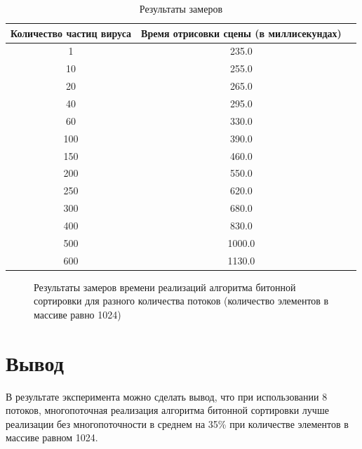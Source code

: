 \begin{table}[h]
	\begin{center}
		\begin{threeparttable}
			\captionsetup{justification=raggedright,singlelinecheck=off}
			\caption{\label{tbl:timings} Результаты замеров}
			\begin{tabular}{|c|c|c|}
				\hline
				Количество частиц вируса& Время отрисовки сцены (в миллисекундах) \\  \hline
				1 & 235.0 \\ \hline 
				10 & 255.0 \\ \hline 
				20 & 265.0 \\ \hline 
				40 & 295.0 \\ \hline 
				60 & 330.0 \\ \hline 
				100 & 390.0 \\ \hline 
				150 & 460.0 \\ \hline 
				200 & 550.0 \\ \hline 
				250 & 620.0 \\ \hline 
				300 & 680.0 \\ \hline 
				400 & 830.0 \\ \hline 
				500 & 1000.0 \\ \hline 
				600 & 1130.0 \\ \hline 
			\end{tabular}
		\end{threeparttable}
	\end{center}
	
\end{table}

\begin{figure}[ph!]
	\caption{Результаты замеров времени реализаций алгоритма битонной сортировки для разного количества потоков (количество элементов в массиве равно 1024)}
	\label{fig:timings}
\end{figure}

\clearpage

\section*{Вывод}

В результате эксперимента можно сделать вывод, что при использовании 8 потоков, многопоточная реализация алгоритма битонной сортировки лучше реализации без многопоточности в среднем на 35\% при количестве элементов в массиве равном 1024. 


